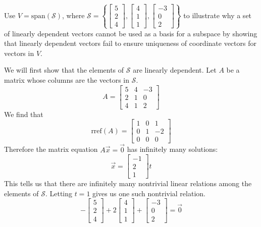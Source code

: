 \documentclass{ximera}
\begin{document}
\begin{example}
Use $V=\mbox{span}(\mathcal{S})$, where $\mathcal{S}=\left\{\begin{bmatrix}5\\2\\4\end{bmatrix},\begin{bmatrix}4\\1\\1\end{bmatrix},\begin{bmatrix}-3\\0\\2\end{bmatrix}\right\}$ to illustrate why a set of linearly dependent vectors cannot be used as a basis for a subspace by showing that linearly dependent vectors fail to ensure uniqueness of coordinate vectors  for vectors in $V$.
\begin{explanation}
We will first show that the elements of $\mathcal{S}$ are linearly dependent.  Let $A$ be a matrix whose columns are the vectors in $\mathcal{S}$.
$$A=\begin{bmatrix}5&4&-3\\2&1&0\\4&1&2\end{bmatrix}$$
We find that 
$$\mbox{rref}(A) = \begin{bmatrix}  
 1&0&1\\0&1&-2\\0&0&0
 \end{bmatrix}$$
Therefore the matrix equation  $A\vec{x}=\vec{0}$ has infinitely many solutions:
$$\vec{x}=\begin{bmatrix}-1\\2\\1\end{bmatrix}t$$
This tells us that there are infinitely many nontrivial linear relations among the elements of $\mathcal{S}$.  Letting $t=1$ gives us one such nontrivial relation.
$$-\begin{bmatrix}5\\2\\4\end{bmatrix}+2\begin{bmatrix}4\\1\\1\end{bmatrix}+\begin{bmatrix}-3\\0\\2\end{bmatrix}=\vec{0}$$


\end{explanation}
\end{example}
\end{document}

